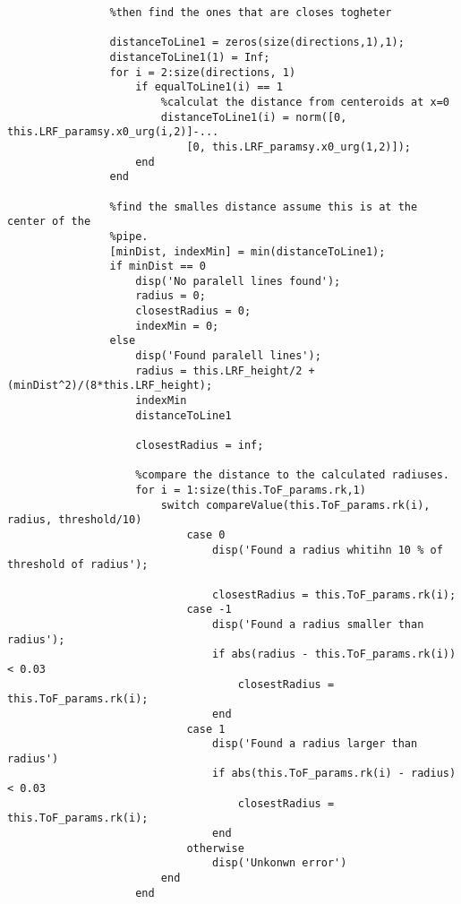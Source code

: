 \begin{lstlisting}
                %then find the ones that are closes togheter
                
                distanceToLine1 = zeros(size(directions,1),1);
                distanceToLine1(1) = Inf;
                for i = 2:size(directions, 1)
                    if equalToLine1(i) == 1
                        %calculat the distance from centeroids at x=0
                        distanceToLine1(i) = norm([0, this.LRF_paramsy.x0_urg(i,2)]-...
                            [0, this.LRF_paramsy.x0_urg(1,2)]);
                    end
                end
                
                %find the smalles distance assume this is at the center of the
                %pipe.
                [minDist, indexMin] = min(distanceToLine1);
                if minDist == 0
                    disp('No paralell lines found');
                    radius = 0;
                    closestRadius = 0;
                    indexMin = 0;
                else
                    disp('Found paralell lines');
                    radius = this.LRF_height/2 + (minDist^2)/(8*this.LRF_height);
                    indexMin
                    distanceToLine1
                    
                    closestRadius = inf;
                    
                    %compare the distance to the calculated radiuses.
                    for i = 1:size(this.ToF_params.rk,1)
                        switch compareValue(this.ToF_params.rk(i), radius, threshold/10)
                            case 0
                                disp('Found a radius whitihn 10 % of threshold of radius');
                                
                                closestRadius = this.ToF_params.rk(i);
                            case -1
                                disp('Found a radius smaller than radius');
                                if abs(radius - this.ToF_params.rk(i)) < 0.03
                                    closestRadius = this.ToF_params.rk(i);
                                end
                            case 1
                                disp('Found a radius larger than radius')
                                if abs(this.ToF_params.rk(i) - radius) < 0.03
                                    closestRadius = this.ToF_params.rk(i);
                                end
                            otherwise
                                disp('Unkonwn error')
                        end
                    end
                    

\end{lstlisting}
